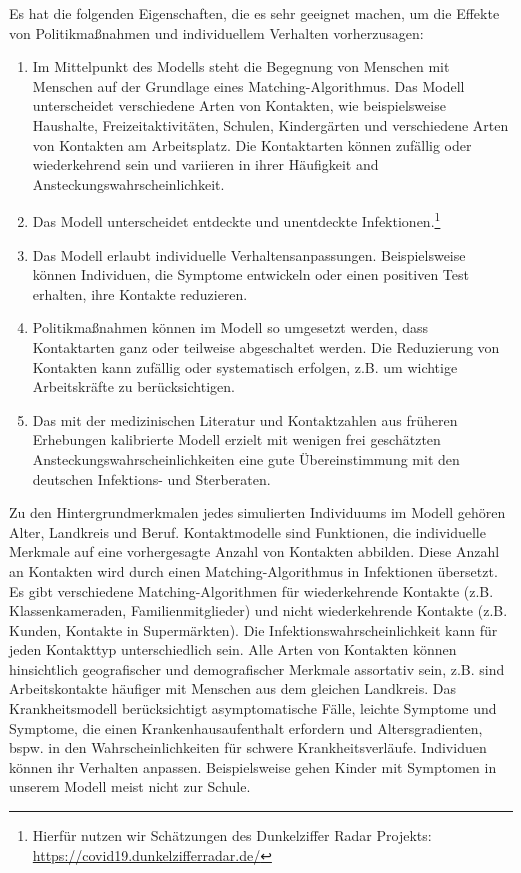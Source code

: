 \documentclass[a4paper,11pt,leqno,fleqn]{article}
\begin{document}
Es hat die folgenden Eigenschaften, die es sehr geeignet machen, um die Effekte von Politikmaßnahmen und individuellem Verhalten vorherzusagen:

\begin{enumerate}
    \item Im  Mittelpunkt des Modells steht die Begegnung von Menschen mit Menschen auf der Grundlage eines Matching-Algorithmus. Das Modell unterscheidet verschiedene Arten von Kontakten, wie beispielsweise Haushalte, Freizeitaktivitäten, Schulen, Kindergärten und verschiedene Arten von Kontakten am Arbeitsplatz. Die Kontaktarten können zufällig oder wiederkehrend sein und variieren in ihrer Häufigkeit and Ansteckungswahrscheinlichkeit.
    \item Das Modell unterscheidet entdeckte und unentdeckte Infektionen.\footnote{Hierfür nutzen wir Schätzungen des Dunkelziffer Radar Projekts: \url{https://covid19.dunkelzifferradar.de/}}
    \item Das Modell erlaubt individuelle Verhaltensanpassungen. Beispielsweise können Individuen, die Symptome entwickeln oder einen positiven Test erhalten, ihre Kontakte reduzieren.
    \item Politikmaßnahmen können im Modell so umgesetzt werden, dass Kontaktarten ganz oder teilweise abgeschaltet werden. Die Reduzierung von Kontakten kann zufällig oder systematisch erfolgen, z.B. um wichtige Arbeitskräfte zu berücksichtigen.
    \item Das mit der medizinischen Literatur und Kontaktzahlen aus früheren Erhebungen kalibrierte Modell erzielt mit wenigen frei geschätzten Ansteckungswahrscheinlichkeiten eine gute Übereinstimmung mit den deutschen Infektions- und Sterberaten.
\end{enumerate}

Zu den Hintergrundmerkmalen jedes simulierten Individuums im Modell gehören Alter, Landkreis und Beruf.
Kontaktmodelle sind Funktionen, die individuelle Merkmale auf eine vorhergesagte Anzahl von Kontakten abbilden.
Diese Anzahl an Kontakten wird durch einen Matching-Algorithmus in Infektionen übersetzt.
Es gibt verschiedene Matching-Algorithmen für wiederkehrende Kontakte (z.B. Klassenkameraden, Familienmitglieder) und nicht wiederkehrende Kontakte (z.B. Kunden, Kontakte in Supermärkten).
Die Infektionswahrscheinlichkeit kann für jeden Kontakttyp unterschiedlich sein.
Alle Arten von Kontakten können hinsichtlich geografischer und demografischer Merkmale assortativ sein, z.B. sind Arbeitskontakte häufiger mit Menschen aus dem gleichen Landkreis.
Das Krankheitsmodell berücksichtigt asymptomatische Fälle, leichte Symptome und Symptome, die einen Krankenhausaufenthalt erfordern und Altersgradienten, bspw. in  den  Wahrscheinlichkeiten  für schwere Krankheitsverläufe. Individuen können ihr Verhalten anpassen. Beispielsweise gehen Kinder mit Symptomen in unserem Modell meist nicht zur Schule.
\end{document}
